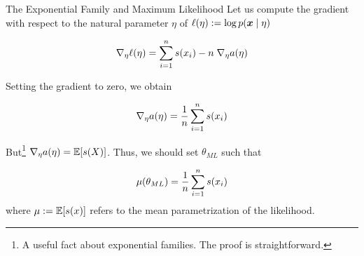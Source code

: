 \documentclass[10pt]{beamer}
\begin{document}
\begin{frame}{The Exponential Family and Maximum Likelihood}
\footnotesize
 Let us compute the gradient with respect to the natural parameter $\eta$ of $\ell(\eta) := \log p({\boldsymbol x} \; | \; \eta)$

\[ \nabla_\eta \ell(\eta) = \displaystyle\sum_{i=1}^n s(x_i) - n \; \nabla_\eta a(\eta) \]

Setting the gradient to zero, we obtain

\[ \nabla_\eta a(\eta) = \displaystyle\frac{1}{n}  \displaystyle\sum_{i=1}^n s(x_i) \]

But\footnote{A useful fact about exponential families.  The proof is straightforward.}    $\nabla_\eta a(\eta) = \mathbb{E} [s(X)]$. Thus, we should set $\theta_{ML}$ such that

\[ \mu(\theta_{ML}) = \displaystyle\frac{1}{n} \displaystyle\sum_{i=1}^n s(x_i) \]
where $\mu := \mathbb{E}[s(x)]$ refers to the mean parametrization of the likelihood.
\end{frame}
\end{document}
